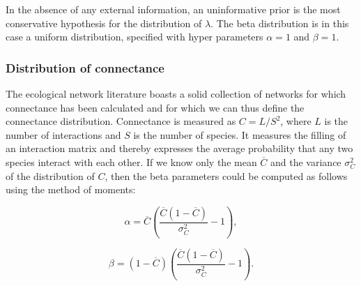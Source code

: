 \documentclass[12pt]{article}
\begin{document}
\begin{spacing}{2.0}
          In the absence of any external information, an uninformative prior is the most conservative hypothesis for the distribution of $\lambda$. The beta distribution is in this case a uniform distribution, specified with hyper parameters $\alpha=1$ and $\beta=1$. 

      \subsubsection*{Distribution of connectance}
        
          The ecological network literature boasts a solid collection of networks for which connectance has been calculated and for which we can thus define the connectance distribution. Connectance is measured as $C = L/S^2$, where $L$ is the number of interactions and $S$ is the number of species. It measures the filling of an interaction matrix and thereby expresses the average probability that any two species interact with each other. If we know only the mean $\overline{C}$ and the variance $\sigma_C^2$ of the distribution of $C$,
          then the beta parameters could be computed as follows using the method of moments:

          \begin{equation}
          \alpha = \overline{C}(\frac{\overline{C}(1-\overline{C})}{\sigma_C^2}-1) ,
          \end{equation}

          \begin{equation}
          \beta = (1-\overline{C})(\frac{\overline{C}(1-\overline{C})}{\sigma_C^2}-1) .
          \end{equation}
    



\end{spacing}
\end{document}
